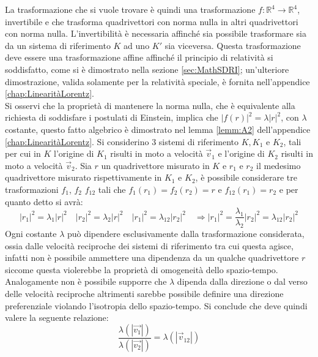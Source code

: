 La trasformazione che si vuole trovare è quindi una trasformazione $f:\mathbb{R}^4\rightarrow\mathbb{R}^4$, invertibile e che trasforma quadrivettori con norma nulla in altri quadrivettori con norma nulla. L'invertibilità è necessaria affinché sia possibile trasformare sia da un sistema di riferimento $K$ ad uno $K'$ sia viceversa. Questa trasformazione deve essere una trasformazione affine affinché il principio di relatività si soddisfatto, come si è dimostrato nella sezione \ref{sec:MathSDRI}; un'ulteriore dimostrazione, valida solamente per la relatività speciale, è fornita nell'appendice \ref{chap:LinearitàLorentz}.\\

Si osservi che la proprietà di mantenere la norma nulla, che è equivalente alla richiesta di soddisfare i postulati di Einstein, implica che  $|f(r)|^2=\lambda |r|^2$, con $\lambda$ costante, questo fatto algebrico è dimostrato nel lemma \ref{lemm:A2} dell'appendice \ref{chap:LinearitàLorentz}. Si considerino $3$ sistemi di riferimento $ K, K_1$ e $K_2$, tali per cui in $K$ l'origine di $K_1$ risulti in moto a velocità $\vec{v}_1$ e l'origine di $K_2$ risulti in moto a velocità $\vec{v}_2$. Sia $r$ un quadrivettore misurato in $K$ e $r_1$ e $r_2$ il medesimo quadrivettore misurato rispettivamente in $K_1$ e $K_2$, è possibile considerare tre trasformazioni $f_1$, $f_2$ $f_{12}$ tali che $f_1(r_1)=f_2(r_2)=r$ e $f_{12}(r_1)=r_2$ e per quanto detto si avrà:
\begin{equation*}
    |r_1|^2=\lambda_1 |r|^2 \quad |r_2|^2=\lambda_2 |r|^2 \quad |r_1|^2=\lambda_{12} |r_2|^2 \quad  \Rightarrow |r_1|^2=\frac{\lambda_1}{\lambda_2}|r_2|^2=\lambda_{12}|r_2|^2
\end{equation*}
Ogni costante $\lambda$ può dipendere esclusivamente dalla trasformazione considerata, ossia dalle velocità reciproche dei sistemi di riferimento tra cui questa agisce, infatti non è possibile ammettere una dipendenza da un qualche quadrivettore $r$ siccome questa violerebbe la proprietà di omogeneità dello spazio-tempo. Analogamente non è possibile supporre che $\lambda$ dipenda dalla direzione o dal verso delle velocità reciproche altrimenti sarebbe possibile definire una direzione preferenziale violando l'isotropia dello spazio-tempo. Si conclude che deve quindi valere la seguente relazione:
\begin{equation}
    \frac{\lambda(|\vec{v_1}|)}{\lambda(|\vec{v_2}|)}=\lambda(|\vec{v}_{12}|)
    \label{fraclambda}
\end{equation} 
